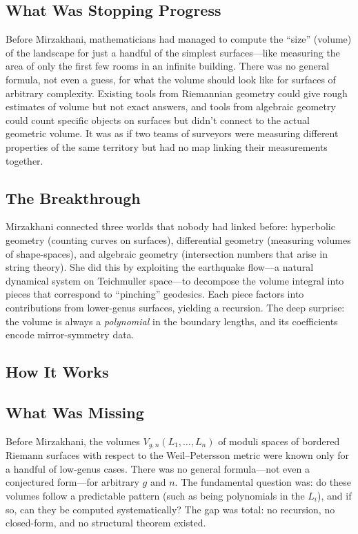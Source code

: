 \subsection{What Was Stopping Progress}
Before Mirzakhani, mathematicians had managed to compute the ``size'' (volume) of the landscape for just a handful of the simplest surfaces---like measuring the area of only the first few rooms in an infinite building. There was no general formula, not even a guess, for what the volume should look like for surfaces of arbitrary complexity. Existing tools from Riemannian geometry could give rough estimates of volume but not exact answers, and tools from algebraic geometry could count specific objects on surfaces but didn't connect to the actual geometric volume. It was as if two teams of surveyors were measuring different properties of the same territory but had no map linking their measurements together.

\subsection{The Breakthrough}
Mirzakhani connected three worlds that nobody had linked before: hyperbolic geometry (counting curves on surfaces), differential geometry (measuring volumes of shape-spaces), and algebraic geometry (intersection numbers that arise in string theory). She did this by exploiting the earthquake flow---a natural dynamical system on Teichmuller space---to decompose the volume integral into pieces that correspond to ``pinching'' geodesics. Each piece factors into contributions from lower-genus surfaces, yielding a recursion. The deep surprise: the volume is always a \emph{polynomial} in the boundary lengths, and its coefficients encode mirror-symmetry data.

\subsection{How It Works}

\subsection{What Was Missing}
Before Mirzakhani, the volumes $V_{g,n}(L_1, \ldots, L_n)$ of moduli spaces of bordered Riemann surfaces with respect to the Weil--Petersson metric were known only for a handful of low-genus cases. There was no general formula---not even a conjectured form---for arbitrary $g$ and $n$. The fundamental question was: do these volumes follow a predictable pattern (such as being polynomials in the $L_i$), and if so, can they be computed systematically? The gap was total: no recursion, no closed-form, and no structural theorem existed.

